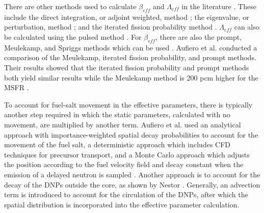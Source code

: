 There are other methods used to calculate $\beta_{eff}$ and $\Lambda_{eff}$ in the literature \cite{verboomen2006monte}. These include the direct integration, or adjoint
weighted, method \cite{keepin1965physics}; the eigenvalue, or perturbation, method \cite{henry1958application}; and the iterated fission probability method \cite{bohl1964computation}.
$\Lambda_{eff}$ can also be calculated using the pulsed method \cite{romero2022calculation}.
For $\beta_{eff}$, there are also the prompt, Meulekamp, and Spriggs methods which can be used \cite{romero2022calculation, meulekamp2006calculating}.
Aufiero et al. conducted a comparison of the Meulekamp, iterated fission probability, and prompt methods.
Their results showed that the iterated fission probability and prompt methods both yield similar results while the Meulekamp method is 200 pcm higher for the \gls{MSFR} \cite{aufiero2014calculating}.

To account for fuel-salt movement in the effective parameters, there is typically another step required in which the static parameters, calculated with no movement, are multiplied by another term.
Aufiero et al. used an analytical approach with importance-weighted spatial decay probabilities to account for the movement of the fuel salt, a deterministic approach which includes \gls{CFD} techniques for precursor transport, and a Monte Carlo approach which adjusts the position according to the fuel velocity field and decay constant when the emission of a delayed neutron is sampled \cite{aufiero2014calculating}.
Another approach is to account for the decay of the \glspl{DNP} outside the core, as shown by Nestor \cite{nestor1960reactor}.
Generally, an advection term is introduced to account for the circulation of the \glspl{DNP}, after which the spatial distribution is incorporated into the effective parameter calculation.
